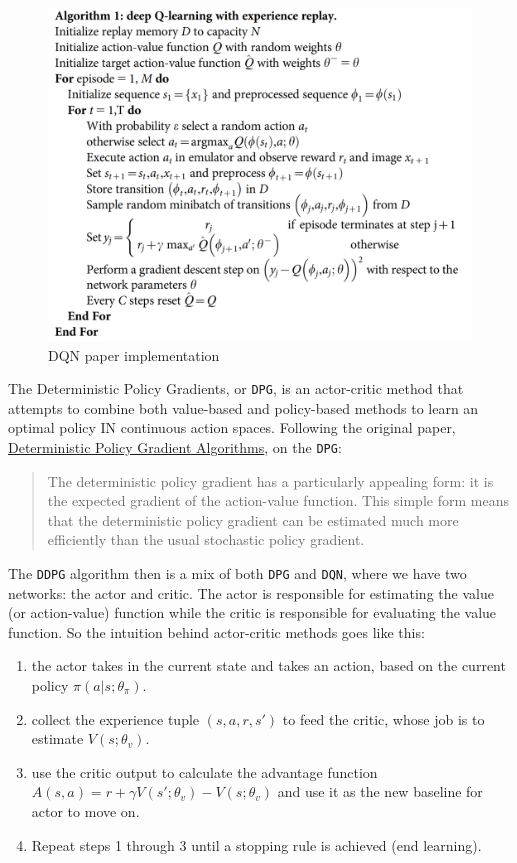 \documentclass[
]{article}
\begin{document}
\begin{figure}
\centering
\includegraphics{imgs/dqn_print_1.png}
\caption{DQN paper implementation}
\end{figure}

The Deterministic Policy Gradients, or \texttt{DPG}, is an actor-critic
method that attempts to combine both value-based and policy-based
methods to learn an optimal policy IN continuous action spaces.
Following the original paper,
\href{http://proceedings.mlr.press/v32/silver14.pdf}{Deterministic
Policy Gradient Algorithms}, on the \texttt{DPG}:

\begin{quote}
The deterministic policy gradient has a particularly appealing form: it
is the expected gradient of the action-value function. This simple form
means that the deterministic policy gradient can be estimated much more
efficiently than the usual stochastic policy gradient.
\end{quote}

The \texttt{DDPG} algorithm then is a mix of both \texttt{DPG} and
\texttt{DQN}, where we have two networks: the actor and critic. The
actor is responsible for estimating the value (or action-value) function
while the critic is responsible for evaluating the value function. So
the intuition behind actor-critic methods goes like this:

\begin{enumerate}
\def\labelenumi{\arabic{enumi}.}
\item
  the actor takes in the current state and takes an action, based on the
  current policy \(\pi(a|s;\theta_{\pi})\).
\item
  collect the experience tuple \((s,a,r,s')\) to feed the critic, whose
  job is to estimate \(V(s;\theta_{v})\).
\item
  use the critic output to calculate the advantage function
  \(A(s,a)=r + \gamma V(s';\theta_{v}) - V(s;\theta_{v})\) and use it as
  the new baseline for actor to move on.
\item
  Repeat steps 1 through 3 until a stopping rule is achieved (end
  learning).
\end{enumerate}
\end{document}

